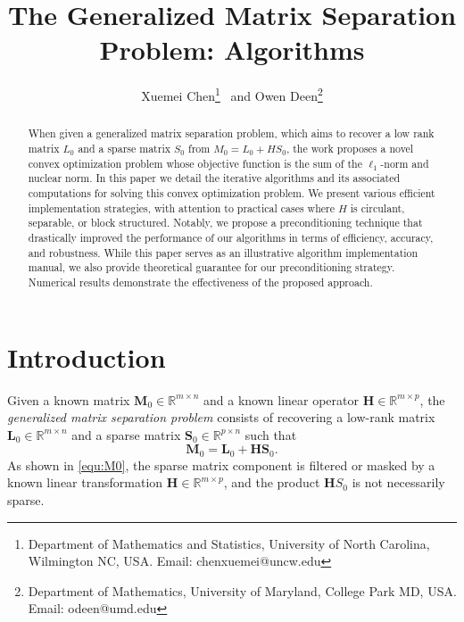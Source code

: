 \documentclass[10pt]{article}  	%
\title{The Generalized Matrix Separation Problem: Algorithms}
\author{Xuemei Chen\thanks{
                  Department of Mathematics and Statistics, University of North Carolina, Wilmington NC, USA. Email: chenxuemei@uncw.edu}
         \ and Owen Deen\thanks{
                  Department of Mathematics, University of Maryland, College Park MD, USA. Email: odeen@umd.edu }%
        }
\theoremstyle{definition}
\theoremstyle{definition}
\newcommand{\R}{{\mathbb{R}}}
\newcommand{\mH}{\mathbf{H}}
\newcommand{\mL}{\mathbf{L}}
\newcommand{\mM}{\mathbf{M}}
\newcommand{\mS}{\mathbf{S}}
\theoremstyle{remark}
\begin{document}
\maketitle

\begin{abstract}
When given a generalized matrix separation problem, which aims to recover a low rank matrix $L_0$ and a sparse matrix $S_0$ from $M_0=L_0+HS_0$, the work \cite{CW25} proposes a novel convex optimization problem whose objective function is the sum of the $\ell_1$-norm and nuclear norm. In this paper we detail the iterative algorithms and its associated computations for solving this convex optimization problem. We present various efficient implementation strategies, with attention to practical cases where $H$ is circulant, separable, or block structured. Notably, we propose a preconditioning technique that drastically improved the performance of our algorithms in terms of efficiency, accuracy, and robustness. While this paper serves as an illustrative algorithm implementation manual, we also provide theoretical guarantee for our preconditioning strategy. Numerical results demonstrate the effectiveness of the proposed approach.
\end{abstract}


\section{Introduction} \label{sec:intro}
 
 Given a known matrix $\mM_0 \in \R^{m \times n}$ and a known linear operator $\mH \in \mathbb{R}^{m\times p}$, the \emph{generalized matrix separation problem} consists of recovering a low-rank matrix $\mL_0 \in \mathbb{R}^{m \times n}$ and a sparse matrix $\mS_0 \in \R^{p\times n}$ such that
 \begin{equation}\label{equ:M0}
 \mM_0 = \mL_0 + \mH\mS_0.
 \end{equation} 
 As shown in \eqref{equ:M0}, the sparse matrix component is filtered or masked by a known linear transformation $\mH \in \mathbb{R}^{m \times p}$, and the product $\mH S_0$ is not necessarily sparse.
  
\end{document}
